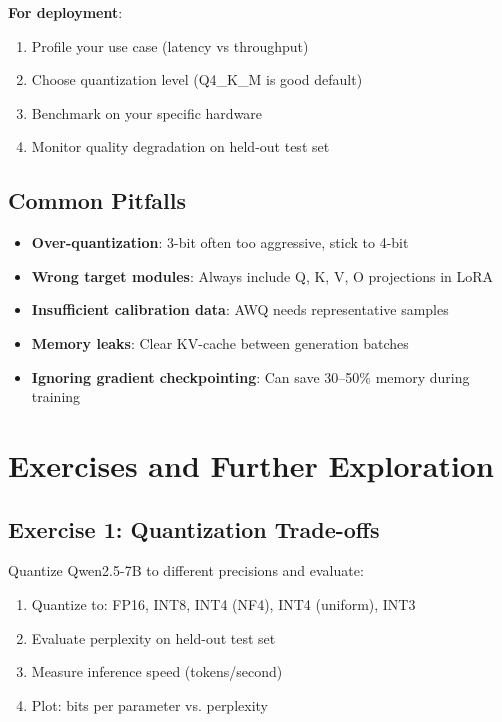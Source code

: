 \documentclass{article}
\begin{document}
\textbf{For deployment}:
\begin{enumerate}
\item Profile your use case (latency vs throughput)
\item Choose quantization level (Q4\_K\_M is good default)
\item Benchmark on your specific hardware
\item Monitor quality degradation on held-out test set
\end{enumerate}

\subsection{Common Pitfalls}

\begin{itemize}
\item \textbf{Over-quantization}: 3-bit often too aggressive, stick to 4-bit
\item \textbf{Wrong target modules}: Always include Q, K, V, O projections in LoRA
\item \textbf{Insufficient calibration data}: AWQ needs representative samples
\item \textbf{Memory leaks}: Clear KV-cache between generation batches
\item \textbf{Ignoring gradient checkpointing}: Can save 30--50\% memory during training
\end{itemize}

\section{Exercises and Further Exploration}

\subsection{Exercise 1: Quantization Trade-offs}

Quantize Qwen2.5-7B to different precisions and evaluate:

\begin{enumerate}
\item Quantize to: FP16, INT8, INT4 (NF4), INT4 (uniform), INT3
\item Evaluate perplexity on held-out test set
\item Measure inference speed (tokens/second)
\item Plot: bits per parameter vs. perplexity
\end{enumerate}
\end{document}
